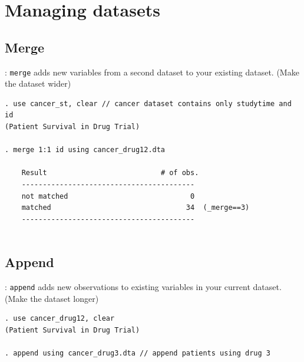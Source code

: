 \documentclass{beamer}
\begin{document}
\section{Managing datasets}
\subsection{Merge}
\begin{frame}[fragile]{\secname : \subsecname}
\verb|merge| adds new variables from a second dataset to your existing dataset.
(Make the dataset wider)\\[4mm]
\small
\begin{verbatim}
. use cancer_st, clear // cancer dataset contains only studytime and id
(Patient Survival in Drug Trial)

. merge 1:1 id using cancer_drug12.dta

    Result                           # of obs.
    -----------------------------------------
    not matched                             0
    matched                                34  (_merge==3)
    -----------------------------------------
	
\end{verbatim}

\end{frame}

\subsection{Append}
\begin{frame}[fragile]{\secname : \subsecname}
\verb|append| adds new observations to existing variables in your current dataset. \\ (Make the dataset longer) \\[4mm]
\small
\begin{verbatim}
. use cancer_drug12, clear 
(Patient Survival in Drug Trial)

. append using cancer_drug3.dta // append patients using drug 3
\end{verbatim}
\end{frame}
\end{document}
